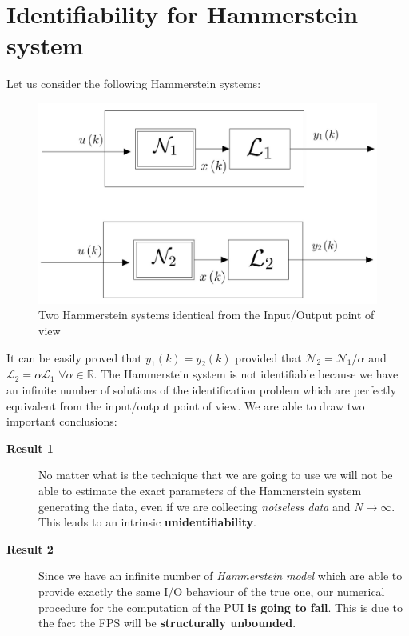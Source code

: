 \section{Identifiability for Hammerstein system}
Let us consider the following Hammerstein systems:
\begin{figure}[h]
    \centering
    \includegraphics[scale=0.2]{img/twohammer.jpg}
    \caption{Two Hammerstein systems identical from the Input/Output point of view}
\end{figure}

\noindent
It can be easily proved that $y_1(k)=y_2(k)$ provided that $\mathcal{N}_2=\mathcal{N}_1/\alpha$ and $\mathcal{L}_2=\alpha\mathcal{L}_{1}$ $\forall\alpha \in \mathbb{R}$. The Hammerstein system is not identifiable because we have an infinite number of solutions of the identification problem which are perfectly equivalent from the input/output point of view. We are able to draw two important conclusions:
\begin{description}
    \item[\textbf{Result 1}] No matter what is the technique that we are going to use we will not be able to estimate the exact parameters of the Hammerstein system generating the data, even if we are collecting \textit{noiseless data} and $N\to\infty$. This leads to an intrinsic \textbf{unidentifiability}.
    \item[\textbf{Result 2}] Since we have an infinite number of \textit{Hammerstein model} which are able to provide exactly the same I/O behaviour of the true one, our numerical procedure for the computation of the PUI \textbf{is going to fail}. This is due to the fact the FPS will be \textbf{structurally unbounded}.
\end{description}

